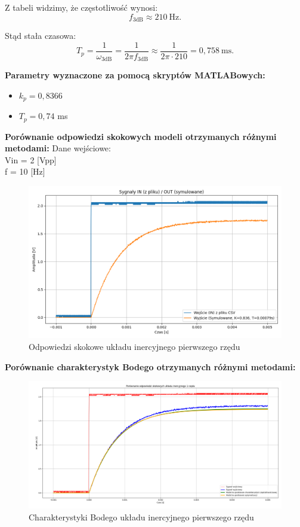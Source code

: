 \documentclass[12pt,a4paper]{article}
\begin{document}
	Z tabeli widzimy, że częstotliwość wynosi:
	\[
	f_{3\text{dB}} \approx 210\ \text{Hz}.
	\]
	
	Stąd stała czasowa:
	\begin{equation}
		T_p = \frac{1}{\omega_{3\text{dB}}} = \frac{1}{2\pi f_{3\text{dB}}}
		\approx \frac{1}{2\pi\cdot 210} = 0{,}758\ \text{ms}.
	\end{equation}
	
	\noindent \textbf{Parametry wyznaczone za pomocą skryptów MATLABowych:}
	\begin{itemize}
		\item $k_p = 0{,}8366$ 
		\item $T_p = 0{,}74$ ms
	\end{itemize}
	
	\noindent \textbf{Porównanie odpowiedzi skokowych modeli otrzymanych różnymi metodami:}
	Dane wejściowe: \\
	Vin = 2 [Vpp]\\
	f = 10 [Hz]
		
	\begin{figure}[H]
		\centering
		\includegraphics[width=1\linewidth]{zdjecia/OdpSkokowa1.png}
		\caption{Odpowiedzi skokowe układu inercyjnego pierwszego rzędu}
		\label{fig:OdpSkokowa1}
	\end{figure}
	
	\noindent \textbf{Porównanie charakterystyk Bodego otrzymanych różnymi metodami:}
		\begin{figure}[H]
		\centering
		\includegraphics[width=1\linewidth]{zdjecia/Body1.png}
		\caption{Charakterystyki Bodego układu inercyjnego pierwszego rzędu}
		\label{fig:Body1}
	\end{figure}
	
\end{document}
